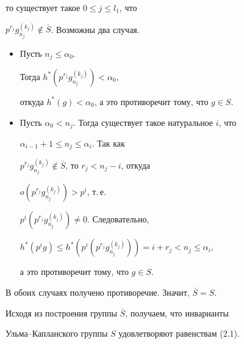 \begin{pf}
то существует такое $0\leq j\leq l_1$, что


$p^{r_j} g_{n_j}^{(k_j)}\not\in\overline{S}$. Возможны два случая.


\begin{itemize}


\item[1.] Пусть $n_j\le\alpha_0$.


Тогда $h^*(p^{r_j}g_{n_j}^{(k_j)})<\alpha_0$,


откуда $h^*(g)<\alpha_0$, а это противоречит тому, что $g\in S$.


\item[2.] Пусть $\alpha_0<n_j$. Тогда существует такое натуральное $i$, что


$\alpha_{i-1}+1\leq n_j\leq \alpha_i$. Так как


$p^{r_j} g_{n_j}^{(k_j)}\notin\overline{S}$, то $r_j<n_j-i$, откуда


$o(p^{r_j} g_{n_j}^{(k_j)})>p^i$, т.\,е.\


$p^i(p^{r_j} g_{n_j}^{(k_j)})\neq 0$. Следовательно,


$h^*(p^ig)\leq h^*(p^i(p^{r_j} g_{n_j}^{(k_j)}))=i+r_j<n_j\leq\alpha_i$,


а это противоречит тому, что $g\in S$.


\end{itemize}


В обоих случаях получено противоречие. Значит, $\overline{S}=S$.


Исходя из построения группы $\overline{S}$, получаем, что инварианты


Ульма--Капланского группы $S$ удовлетворяют равенствам (2.1).


\end{pf}





